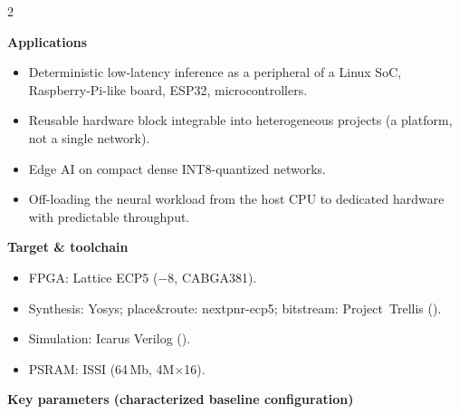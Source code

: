 \begin{multicols}{2}
\columnbreak

{\color{fnDark}\large\bfseries Applications}\\[2pt]
{\footnotesize
\begin{itemize}[leftmargin=1.1em]
\item Deterministic low-latency inference as a peripheral of a
      Linux SoC, Raspberry-Pi-like board, ESP32, microcontrollers.
\item Reusable hardware block integrable into heterogeneous projects
      (a platform, not a single network).
\item Edge AI on compact dense INT8-quantized networks.
\item Off-loading the neural workload from the host CPU to dedicated
      hardware with predictable throughput.
\end{itemize}}

\vspace{4pt}
{\color{fnDark}\large\bfseries Target \& toolchain}\\[2pt]
{\footnotesize
\begin{itemize}[leftmargin=1.1em]
\item FPGA: Lattice ECP5  ($-8$, CABGA381).
\item Synthesis: Yosys; place\&route: nextpnr-ecp5; bitstream: Project~Trellis
      ().
\item Simulation: Icarus Verilog ().
\item PSRAM: ISSI  (64\,Mb, 4M$\times$16).
\end{itemize}}
\end{multicols}

\vspace{2pt}
\noindent
{\small\color{fnDark}\bfseries Key parameters (characterized baseline configuration)}
\vspace{2pt}

